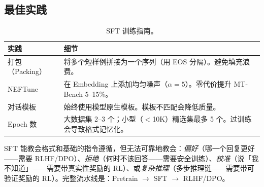 \subsection{最佳实践}
\label{best-practices}

\begin{table}[ht!]
\centering\small
\caption{SFT 训练指南。}
\noindent\begin{tabularx}{\linewidth}{@{}l Z{1}@{}}
\toprule
\textbf{实践} & \textbf{细节} \\
\midrule
打包（Packing） & 将多个短样例拼接为一个序列（用 EOS 分隔）。避免填充浪费。 \\
NEFTune~\cite{jain2024neftune} & 在 Embedding 上添加均匀噪声（$\alpha=5$）。零代价提升 MT-Bench 5--15\%。 \\
对话模板 & 始终使用模型原生模板。模板不匹配会降低质量。 \\
Epoch 数 & 大数据集 2--3 个；小型（$<$10K）精选集最多 5 个。过训练会导致格式记忆化。 \\
\bottomrule
\end{tabularx}
\end{table}

\begin{intuitionbox}
SFT 能教会格式和基础的指令遵循，但无法可靠地教会：\emph{偏好}（哪一个回复更好——需要 RLHF/DPO）、\emph{拒绝}（何时不该回答——需要安全训练）、\emph{校准}（说「我不知道」——需要带真实性奖励的 RL）、或\emph{复杂推理}（多步推理链——需要带可验证奖励的 RL）。完整流水线是：Pretrain $\to$ SFT $\to$ RLHF/DPO。
\end{intuitionbox}


